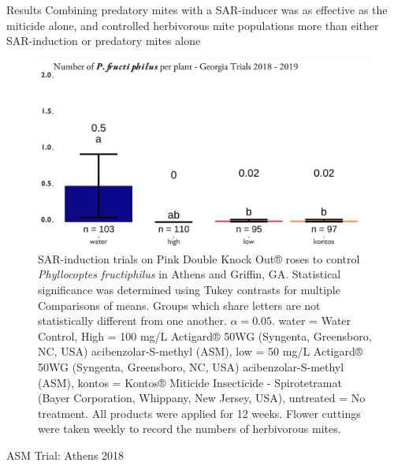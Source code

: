 \documentclass[
  ignorenonframetext,
]{beamer}
\begin{document}
\begin{frame}{Results}
\protect\hypertarget{results-asm-ipm}{}
Combining predatory mites with a SAR-inducer was as effective as the
miticide alone, and controlled herbivorous mite populations more than
either SAR-induction or predatory mites alone

\begin{figure}
\includegraphics[width=0.8\linewidth]{figure/actigard_graph} \caption{SAR-induction trials on Pink Double Knock Out® roses to control \textit{Phyllocoptes fructiphilus} in Athens and Griffin, GA. Statistical significance was determined using Tukey contrasts for multiple Comparisons of means. Groups which share letters are not statistically different from one another. $\alpha = 0.05$. water = Water Control, High = 100 \si{\milli\gram}/\si{\liter} Actigard® 50WG (Syngenta, Greensboro, NC, USA) acibenzolar-S-methyl (ASM), low = 50 \si{\milli\gram}/\si{\liter} Actigard® 50WG (Syngenta, Greensboro, NC, USA) acibenzolar-S-methyl (ASM), kontos = Kontos® Miticide Insecticide - Spirotetramat (Bayer Corporation, Whippany, New Jersey, USA), untreated = No treatment. All products were applied for 12 weeks. Flower cuttings were taken weekly to record the numbers of herbivorous mites.}\label{fig:asm-graph}
\end{figure}

\begin{block}{ASM Trial: Athens 2018}
\protect\hypertarget{asm-trial-athens-2018}{}
\begin{table}


\end{table}
\end{block}
\end{frame}
\end{document}
